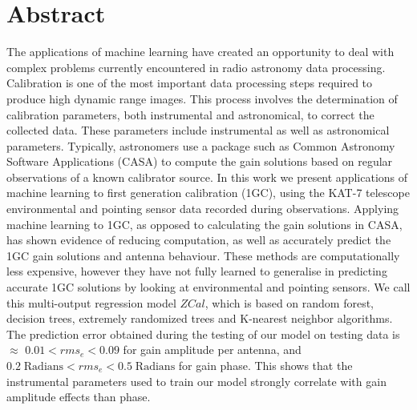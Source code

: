 \chapter*{Abstract} 


The applications of machine learning have created an opportunity to deal with complex problems currently encountered in radio astronomy data processing. Calibration is one of the most important data processing steps required to produce high dynamic range images. This process involves the determination of calibration parameters, both instrumental and astronomical, to correct the
collected data. These parameters include instrumental as well as astronomical parameters. Typically, astronomers use a package such as Common Astronomy Software Applications (CASA) to compute the gain solutions based on regular observations of a known calibrator source. In this work we present applications of machine learning to first generation calibration (1GC), using the KAT-7 telescope environmental and pointing sensor data recorded during observations. Applying machine learning to 1GC, as opposed to calculating the gain solutions in CASA, has shown evidence of reducing computation, as well as accurately predict the 1GC gain solutions and antenna behaviour. These methods are computationally less expensive, however they have not fully learned to generalise  in predicting  accurate 1GC solutions by looking at environmental and pointing sensors. We call this multi-output regression model $\textit{ZCal}$, which is based on random forest, decision trees, extremely randomized trees and K-nearest neighbor algorithms. The prediction error obtained during the testing of our model on testing data is $\approx$ $0.01< rms_{e} <0.09$ for gain amplitude per antenna, and $0.2 \; \mathrm{Radians}< rms_{e}<0.5\; \mathrm{Radians}$ for gain phase. This shows that the instrumental parameters used to train our model strongly correlate with gain amplitude effects than phase.  


